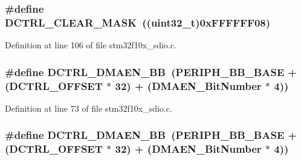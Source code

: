 \subsubsection[{\texorpdfstring{D\+C\+T\+R\+L\+\_\+\+C\+L\+E\+A\+R\+\_\+\+M\+A\+SK}{DCTRL_CLEAR_MASK}}]{\setlength{\rightskip}{0pt plus 5cm}\#define D\+C\+T\+R\+L\+\_\+\+C\+L\+E\+A\+R\+\_\+\+M\+A\+SK~(({\bf uint32\+\_\+t})0x\+F\+F\+F\+F\+F\+F08)}\hypertarget{group___s_d_i_o___private___types_definitions_ga9e9fc7810b95805aeeb760bbdd87fa9b}{}\label{group___s_d_i_o___private___types_definitions_ga9e9fc7810b95805aeeb760bbdd87fa9b}


Definition at line 106 of file stm32f10x\+\_\+sdio.\+c.

\subsubsection[{\texorpdfstring{D\+C\+T\+R\+L\+\_\+\+D\+M\+A\+E\+N\+\_\+\+BB}{DCTRL_DMAEN_BB}}]{\setlength{\rightskip}{0pt plus 5cm}\#define D\+C\+T\+R\+L\+\_\+\+D\+M\+A\+E\+N\+\_\+\+BB~({\bf P\+E\+R\+I\+P\+H\+\_\+\+B\+B\+\_\+\+B\+A\+SE} + ({\bf D\+C\+T\+R\+L\+\_\+\+O\+F\+F\+S\+ET} $\ast$ 32) + ({\bf D\+M\+A\+E\+N\+\_\+\+Bit\+Number} $\ast$ 4))}\hypertarget{group___s_d_i_o___private___types_definitions_ga43f7336d4f955c6cf1f676ccbc043fe9}{}\label{group___s_d_i_o___private___types_definitions_ga43f7336d4f955c6cf1f676ccbc043fe9}


Definition at line 73 of file stm32f10x\+\_\+sdio.\+c.

\subsubsection[{\texorpdfstring{D\+C\+T\+R\+L\+\_\+\+D\+M\+A\+E\+N\+\_\+\+BB}{DCTRL_DMAEN_BB}}]{\setlength{\rightskip}{0pt plus 5cm}\#define D\+C\+T\+R\+L\+\_\+\+D\+M\+A\+E\+N\+\_\+\+BB~({\bf P\+E\+R\+I\+P\+H\+\_\+\+B\+B\+\_\+\+B\+A\+SE} + ({\bf D\+C\+T\+R\+L\+\_\+\+O\+F\+F\+S\+ET} $\ast$ 32) + ({\bf D\+M\+A\+E\+N\+\_\+\+Bit\+Number} $\ast$ 4))}\hypertarget{group___s_d_i_o___private___types_definitions_ga43f7336d4f955c6cf1f676ccbc043fe9}{}\label{group___s_d_i_o___private___types_definitions_ga43f7336d4f955c6cf1f676ccbc043fe9}


